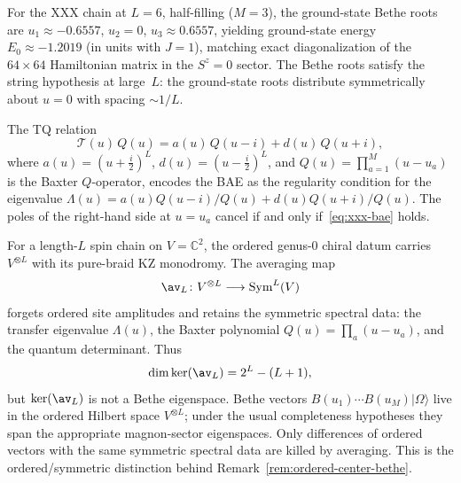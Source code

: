 \begin{computation}
\label{comp:bethe-exact}
For the XXX chain at $L = 6$, half-filling ($M = 3$), the
ground-state Bethe roots are $u_1 \approx -0.6557$,
$u_2 = 0$, $u_3 \approx 0.6557$, yielding ground-state energy
$E_0 \approx -1.2019$ \textup{(}in units with $J = 1$\textup{)},
matching exact diagonalization of the $64 \times 64$
Hamiltonian matrix in the $S^z = 0$ sector.
The Bethe roots satisfy the string
hypothesis at large~$L$: the ground-state roots distribute
symmetrically about $u = 0$ with spacing $\sim 1/L$.

The TQ relation
\begin{equation}\label{eq:tq-relation}
\mathcal{T}(u)\, Q(u)
= a(u)\, Q(u - i) + d(u)\, Q(u + i),
\end{equation}
where $a(u) = (u + \frac{i}{2})^L$, $d(u) = (u - \frac{i}{2})^L$,
and $Q(u) = \prod_{a=1}^M (u - u_a)$ is the Baxter $Q$-operator,
encodes the BAE as the regularity condition for the eigenvalue
$\Lambda(u) = a(u) Q(u-i)/Q(u) + d(u) Q(u+i)/Q(u)$.
The poles of the right-hand side at $u = u_a$ cancel if and only
if~\eqref{eq:xxx-bae} holds.
\end{computation}

\begin{remark}
\label{rem:yangcomp-ordered-bethe-shadow}
For a length-$L$ spin chain on $V=\mathbb{C}^2$, the ordered
genus-$0$ chiral datum carries $V^{\otimes L}$ with its
pure-braid KZ monodromy. The averaging map
\[
\av_L\colon V^{\otimes L}\longrightarrow \operatorname{Sym}^L(V)
\]
forgets ordered site amplitudes and retains the symmetric spectral
data: the transfer eigenvalue $\Lambda(u)$, the Baxter polynomial
$Q(u)=\prod_a(u-u_a)$, and the quantum determinant. Thus
\[
\dim\ker(\av_L)=2^L-(L+1),
\]
but $\ker(\av_L)$ is not a Bethe eigenspace. Bethe vectors
$B(u_1)\cdots B(u_M)|\Omega\rangle$ live in the ordered Hilbert space
$V^{\otimes L}$; under the usual completeness hypotheses they span
the appropriate magnon-sector eigenspaces. Only differences of
ordered vectors with the same symmetric spectral data are killed by
averaging. This is the ordered/symmetric distinction behind
Remark~\ref{rem:ordered-center-bethe}.
\end{remark}

